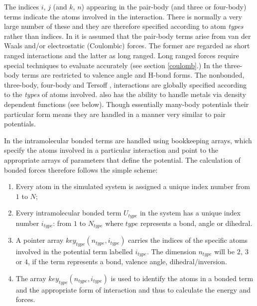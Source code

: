 The indices $i$, $j$ (and $k$, $n$) appearing in the pair-body (and
three or four-body) terms indicate the atoms involved in the interaction.
There is normally a very large number of these and they are therefore
specified according to atom {\em types} rather than indices. In
\D{} it is assumed that the pair-body terms arise from van der
Waals
and/or electrostatic (Coulombic) forces. The former are regarded as
short ranged interactions and the latter as long ranged. Long ranged
forces require special techniques to evaluate accurately (see section
\ref{coulomb}.)  In \D{} the three-body terms are restricted to valence
angle and H-bond
forms. The nonbonded,
three-body,
four-body and Tersoff
, interactions are globally specified
according to the {\em types} of atoms involved.  \D{} also has the
ability to handle metals via density dependent functions (see
below). Though essentially many-body potentials their particular form
means they are handled in a manner very similar to pair potentials.

In \D{} the intramolecular bonded terms are handled using
bookkeeping arrays, which specify the atoms involved in a particular
interaction and point to the appropriate arrays of parameters that
define the potential. The calculation of bonded forces therefore
follows the simple scheme: 

\begin{enumerate} 
\item Every atom in the simulated system is assigned a unique index number
from $1$ to $N$; 
\item Every intramolecular bonded term $U_{type}$ in
the system has a unique index number $i_{type}$: from $1$ to
$N_{type}$ where $type$ represents a bond, angle or dihedral.  
\item A pointer array $key_{type}(n_{type},i_{type})$ carries the indices of
the specific atoms involved in the potential term labelled $i_{type}$.
The dimension $n_{type}$ will be $2,~3$ or $4$, if the term represents
a bond, valence angle, dihedral/inversion.  
\item The array $key_{type}(n_{type},i_{type})$ is used to identify
the atoms in a bonded term and the appropriate form of interaction and
thus to calculate the energy and forces.  
\end{enumerate}

